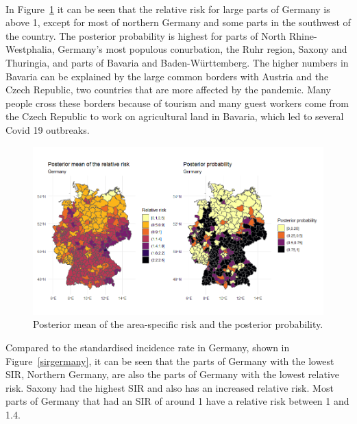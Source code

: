 \\
In Figure~\ref{posteriorGermanyDemo} it can be seen that the relative risk for large parts of Germany is above 1, except for most of northern Germany and some parts in the southwest of the country. The posterior probability is highest for parts of North Rhine-Westphalia, Germany's most populous conurbation, the Ruhr region, Saxony and Thuringia, and parts of Bavaria and Baden-Württemberg. The higher numbers in Bavaria can be explained by the large common borders with Austria and the Czech Republic, two countries that are more affected by the pandemic. Many people cross these borders because of tourism and many guest workers come from the Czech Republic to work on agricultural land in Bavaria, which led to several Covid 19 outbreaks.
\begin{figure}[H]
    \centering
    \includegraphics[width = \textwidth]{posterior_germany_demo.png}
    \caption{Posterior mean of the area-specific risk and the posterior probability.}
    \label{posteriorGermanyDemo}
\end{figure}
%     
Compared to the standardised incidence rate in Germany, shown in Figure~\ref{sirgermany}, it can be seen that the parts of Germany with the lowest SIR, Northern Germany, are also the parts of Germany with the lowest relative risk. Saxony had the highest SIR and also has an increased relative risk. Most parts of Germany that had an SIR of around 1 have a relative risk between 1 and 1.4.
